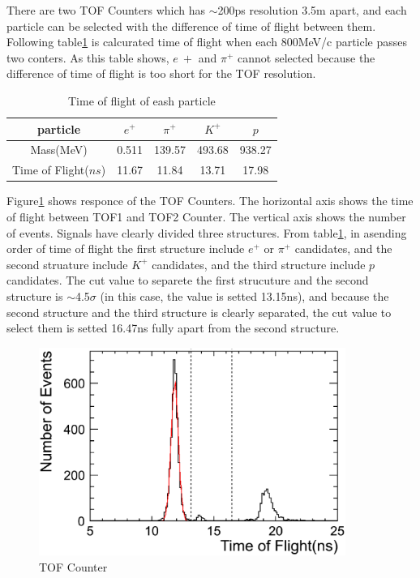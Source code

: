 There are two TOF Counters which has $\sim$200ps resolution 3.5m apart, 
and each particle can be selected with the difference of time of flight between them.
Following table\ref{tb:TOF_expect} is calcurated time of flight when each 800MeV/c particle passes two conters.
As this table shows, $e~{+}$ and $\pi^{+}$ cannot selected because the difference of time of flight is too short for the TOF resolution.\\

\begin{table}
  \centering
  \begin{tabular}[htb]{c|cccc}\hline
    particle & $e^{+}$ & $\pi^{+}$ & $K^{+}$ & $p$ \\ \hline
    Mass(MeV) & 0.511 & 139.57 & 493.68 & 938.27 \\
    Time of Flight($ns$) & 11.67 & 11.84 & 13.71 & 17.98 \\ \hline
  \end{tabular}
  \caption{Time of flight of eash particle}
  \label{tb:TOF_expect}
\end{table}

Figure\ref{fig:TOF} shows responce of the TOF Counters.
The horizontal axis shows the time of flight between TOF1 and TOF2 Counter.
The vertical axis shows the number of events.
Signals have clearly divided three structures.
From table\ref{tb:TOF_expect}, in asending order of time of flight the first structure include $e^{+}$ or $\pi^{+}$ candidates,
and the second struature include $K^{+}$ candidates,
and the third structure include $p$ candidates.
The cut value to separete the first strucuture and the second structure is $\sim$4.5$\sigma$ (in this case, the value is setted 13.15ns), and because the second structure and the third structure is clearly separated, the cut value to select them is setted 16.47ns fully apart from the second structure.\\

\begin{figure}[htbp]
  \centering
  \includegraphics[width=10cm,clip]{fig/TOF.eps}
  \caption{TOF Counter}
  \label{fig:TOF}
\end{figure}

